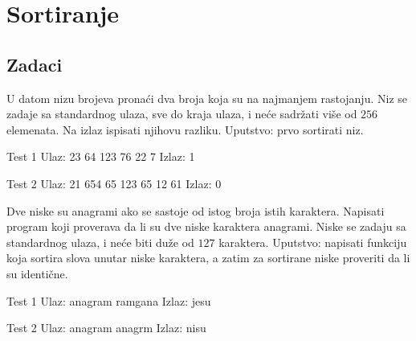 \chapter{Sortiranje}

\section{Zadaci}

\begin{Exercise}[label=501]
  U datom nizu brojeva pronaći dva broja koja su na najmanjem
  rastojanju. Niz se zadaje sa standardnog ulaza, sve do kraja ulaza,
  i neće sadržati više od $256$ elemenata. Na izlaz ispisati njihovu razliku.
Uputstvo: prvo sortirati niz.
  
\begin{miditest}
\begin{test}{Test 1}
Ulaz:   23 64 123 76 22 7
Izlaz:  1
\end{test}
\end{miditest}

\begin{miditest}
\begin{test}{Test 2}
Ulaz:   21 654 65 123 65 12 61
Izlaz:  0
\end{test}
\end{miditest}
  
\end{Exercise}

\begin{Answer}[ref=501]
\end{Answer}
\begin{Exercise}[label=502]
  Dve niske su anagrami ako se sastoje od istog
  broja istih karaktera. Napisati program koji proverava da li su dve niske
  karaktera anagrami.  Niske se zadaju sa standardnog ulaza, i neće
  biti duže od $127$ karaktera.
Uputstvo: napisati funkciju koja sortira slova unutar niske
  karaktera, a zatim za sortirane niske proveriti da li su identične.   
\begin{miditest}
\begin{test}{Test 1}
Ulaz:   anagram ramgana
Izlaz:  jesu
\end{test}
\end{miditest}
\begin{miditest}
\begin{test}{Test 2}
Ulaz:   anagram anagrm
Izlaz:  nisu
\end{test}
\end{miditest}
  
\end{Exercise}


